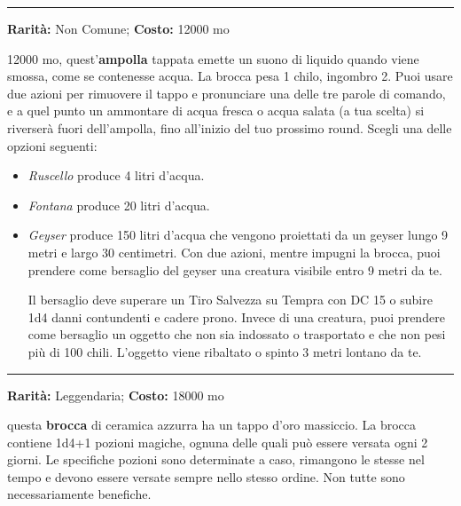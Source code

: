 \begin{multicols}{2}
\smallskip\noindent\rule{\linewidth}{2pt}  \hypertarget{Broccadell'AcquaInfinita}{}\smallskip{}\noindent\label{Broccadell'AcquaInfinita}

\textbf{Rarità:} Non Comune; \textbf{Costo:} 12000 mo

12000 mo, quest'\textbf{ampolla} tappata emette un suono di liquido quando viene smossa, come se contenesse acqua. La brocca pesa 1 chilo, ingombro 2. Puoi usare due azioni per rimuovere il tappo e pronunciare una delle tre parole di comando, e a quel punto un ammontare di acqua fresca o acqua salata (a tua scelta) si riverserà fuori dell'ampolla, fino all'inizio del tuo prossimo round. Scegli una delle opzioni seguenti:

\begin{itemize}[leftmargin=*] \setlength{\itemsep}{0pt}
\item
\emph{Ruscello} produce 4 litri d'acqua.
\item
\emph{Fontana} produce 20 litri d'acqua.
\item
\emph{Geyser} produce 150 litri d'acqua che vengono proiettati da un geyser lungo 9 metri e largo 30 centimetri. Con due azioni, mentre impugni la brocca, puoi prendere come bersaglio del geyser una creatura visibile entro 9 metri da te.

Il bersaglio deve superare un Tiro Salvezza su Tempra con DC 15 o subire 1d4 danni contundenti e cadere prono. Invece di una creatura, puoi prendere come bersaglio un oggetto che non sia indossato o trasportato e che non pesi più di 100 chili. L'oggetto viene ribaltato o spinto 3 metri lontano da te.
\end{itemize}

\smallskip\noindent\rule{\linewidth}{2pt}  \hypertarget{BroccadellePozioni}{}\smallskip{}\noindent\label{BroccadellePozioni}

\textbf{Rarità:} Leggendaria; \textbf{Costo:} 18000 mo

questa \textbf{brocca} di ceramica azzurra ha un tappo d'oro massiccio. La brocca contiene 1d4+1 pozioni magiche, ognuna delle quali può essere versata ogni 2 giorni. Le specifiche pozioni sono determinate a caso, rimangono le stesse nel tempo e devono essere versate sempre nello stesso ordine. Non tutte sono necessariamente benefiche.


\end{multicols}
